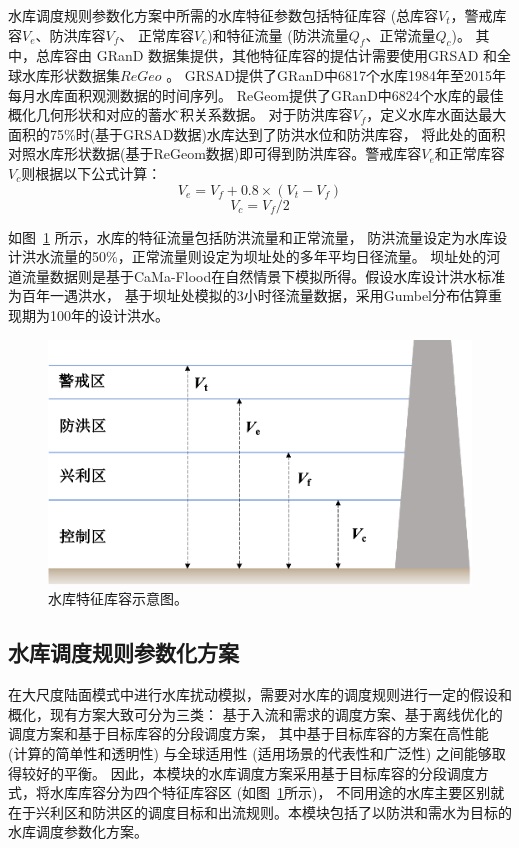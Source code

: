 水库调度规则参数化方案中所需的水库特征参数包括特征库容 (总库容$V_t$，警戒库容$V_e$、防洪库容$V_f$、
正常库容$V_c$)和特征流量 (防洪流量$Q_f$、正常流量$Q_c$)。
其中，总库容由 GRanD 数据集提供，其他特征库容的提估计需要使用GRSAD \citep{zhao2019towards}和全球水库形状数据集$ReGeo$ \citep{yigzaw2018new} 。
GRSAD提供了GRanD中6817个水库1984年至2015年每月水库面积观测数据的时间序列。
ReGeom提供了GRanD中6824个水库的最佳概化几何形状和对应的蓄水\~面积关系数据。
对于防洪库容$V_f$，定义水库水面达最大面积的75\%时(基于GRSAD数据)水库达到了防洪水位和防洪库容，
将此处的面积对照水库形状数据(基于ReGeom数据)即可得到防洪库容。警戒库容$V_e$和正常库容$V_c$则根据以下公式计算：
\begin{equation}
V_{e}=V_{f}+0.8 \times\left(V_{t}-V_{f}\right)
\end{equation}
\begin{equation}
V_{c}=V_{f} / 2
\end{equation}


如图~\ref{fig:水库特征库容示意图} 所示，水库的特征流量包括防洪流量和正常流量，
防洪流量设定为水库设计洪水流量的50\%，正常流量则设定为坝址处的多年平均日径流量。
坝址处的河道流量数据则是基于CaMa-Flood在自然情景下模拟所得。假设水库设计洪水标准为百年一遇洪水，
基于坝址处模拟的3小时径流量数据，采用Gumbel分布估算重现期为100年的设计洪水\citep{boulange2021}。

{
\begin{figure}[]
\centering
\includegraphics{Figures/陆地表面的水分循环/水库特征库容示意图.png}
\caption{水库特征库容示意图。}
\label{fig:水库特征库容示意图}
\end{figure}
}
\subsection{水库调度规则参数化方案}
在大尺度陆面模式中进行水库扰动模拟，需要对水库的调度规则进行一定的假设和概化，现有方案大致可分为三类：
基于入流和需求的调度方案、基于离线优化的调度方案和基于目标库容的分段调度方案，
其中基于目标库容的方案在高性能 (计算的简单性和透明性) 与全球适用性 (适用场景的代表性和广泛性) 之间能够取得较好的平衡\citep{yassin2019representation}。
因此，本模块的水库调度方案采用基于目标库容的分段调度方式，将水库库容分为四个特征库容区 (如图~\ref{fig:水库特征库容示意图}所示)，
不同用途的水库主要区别就在于兴利区和防洪区的调度目标和出流规则。本模块包括了以防洪和需水为目标的水库调度参数化方案。


